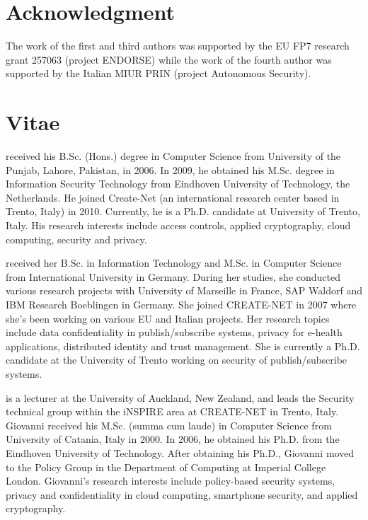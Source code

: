 \documentclass[final,5p,times,twocolumn]{elsarticle}
\begin{document}
\section*{Acknowledgment}
The work of the first and third authors was supported by the EU FP7 research grant 257063 (project ENDORSE) while the work of the fourth author was supported by the Italian MIUR PRIN (project Autonomous Security).









 



\clearpage

\section*{Vitae}

  received his B.Sc. (Hons.) degree in Computer Science from University of the Punjab, Lahore, Pakistan, in 2006. In 2009, he obtained his M.Sc. degree in Information Security Technology from Eindhoven University of Technology, the Netherlands. He joined Create-Net (an international research center based in Trento, Italy) in 2010. Currently, he is a Ph.D. candidate at University of Trento, Italy. His research interests include access controls, applied cryptography, cloud computing, security and privacy.

 received her B.Sc. in Information Technology and M.Sc. in Computer Science from International University in Germany. During her studies, she conducted various research projects with University of Marseille in France, SAP Waldorf and IBM Research Boeblingen in Germany. She joined CREATE-NET in 2007 where she's been working on various EU and Italian projects. Her research topics include data confidentiality in publish/subscribe systems, privacy for e-health applications, distributed identity and trust management. She is currently a Ph.D. candidate at the University of Trento working on security of publish/subscribe systems.

 is a lecturer at the University of Auckland, New Zealand, and leads the Security technical group within the iNSPIRE area at CREATE-NET in Trento, Italy. Giovanni received his M.Sc. (summa cum laude) in Computer Science from University of Catania, Italy in 2000. In 2006, he obtained his Ph.D. from the Eindhoven University of Technology. After obtaining his Ph.D., Giovanni moved to the Policy Group in the Department of Computing at Imperial College London. Giovanni's research interests include policy-based security systems, privacy and confidentiality in cloud computing, smartphone security, and applied cryptography.
\end{document}
